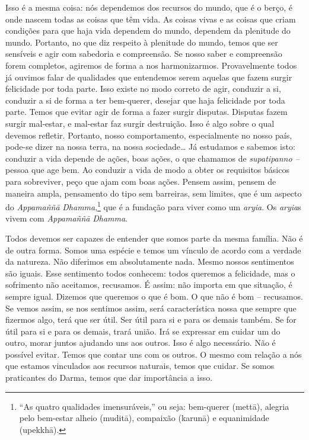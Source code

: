 Isso é a mesma coisa: nós dependemos dos recursos do mundo, que é o
berço, é onde nascem todas as coisas que têm vida. As coisas vivas e as
coisas que criam condições para que haja vida dependem do mundo,
dependem da plenitude do mundo. Portanto, no que diz respeito à
plenitude do mundo, temos que ser sensíveis e agir com sabedoria e
compreensão. Se nosso saber e compreensão forem completos, agiremos de
forma a nos harmonizarmos. Provavelmente todos já ouvimos falar de
qualidades que entendemos serem aquelas que fazem surgir felicidade por
toda parte. Isso existe no modo correto de agir, conduzir a si,
conduzir a si de forma a ter bem-querer, desejar que haja felicidade
por toda parte. Temos que evitar agir de forma a fazer surgir disputas.
Disputas fazem surgir mal-estar, e mal-estar faz surgir destruição.
Isso é algo sobre o qual devemos refletir. Portanto, nosso
comportamento, especialmente no nosso país, pode-se dizer na nossa
terra, na nossa sociedade\ldots{} Já estudamos e sabemos isto: conduzir a vida
depende de ações, boas ações, o que chamamos de \emph{supatipanno –
}pessoa que age bem. Ao conduzir a vida de modo a obter os requisitos
básicos para sobreviver, peço que ajam com boas ações. Pensem assim,
pensem de maneira ampla, pensamento do tipo sem barreiras, sem limites,
que é um aspecto do \emph{Appamaññā} \emph{Dhamma},\footnote{“As
quatro qualidades imensuráveis,” ou seja: bem-querer (mettā), alegria
pelo bem-estar alheio (muditā), compaixão (karunā) e equanimidade
(upekkhā).} que é a fundação para viver como um \emph{aryia}. Os
\emph{aryia}s vivem com \emph{Appamaññā} \emph{Dhamma}. 

Todos devemos ser capazes de entender que somos parte da mesma
família. Não é de outra forma. Somos uma espécie e temos um vínculo de
acordo com a verdade da natureza. Não diferimos em absolutamente nada.
Mesmo nossos sentimentos são iguais. Esse sentimento todos conhecem:
todos queremos a felicidade, mas o sofrimento não aceitamos, recusamos.
É assim: não importa em que situação, é sempre igual. Dizemos que
queremos o que é bom. O que não é bom – recusamos. Se vemos assim, se
nos sentimos assim, será característica nossa que sempre que fizermos
algo, terá que ser útil. Ser útil para si e para os demais também. Se
for útil para si e para os demais, trará união. Irá se expressar em
cuidar um do outro, morar juntos ajudando uns aos outros. Isso é algo
necessário. Não é possível evitar. Temos que contar uns com os outros.
O mesmo com relação a nós que estamos vinculados aos recursos naturais,
temos que cuidar. Se somos praticantes do Darma, temos que dar
importância a isso. 

